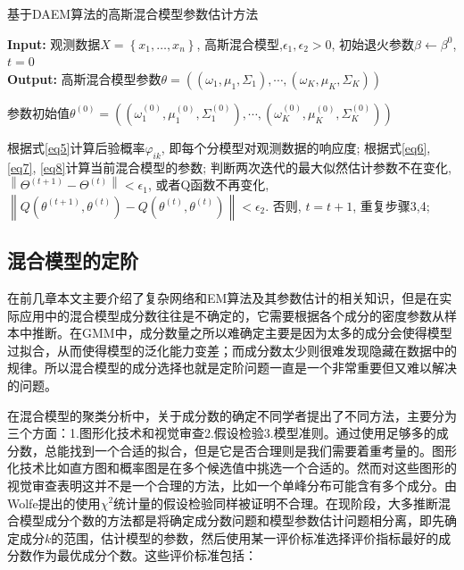 \documentclass[a4paper,12pt,openany,oneside,utf-8]{ctexbook}
\begin{document}
    \begin{algorithm}
	\caption{基于DAEM算法的高斯混合模型参数估计方法} %
	\hspace*{0.02in} {\bf Input:} %
	观测数据$X=\left\{x_{1}, \ldots, x_{n}\right\}$, 高斯混合模型,$\epsilon_{1},\epsilon_{2}>0$, 初始退火参数$\beta\leftarrow\beta^{0}$, $t=0$\\
	\hspace*{0.02in} {\bf Output:} %
	高斯混合模型参数$\theta=\left(\left(\omega_{1}, \mu_{1}, \Sigma_{1}\right), \cdots,\left(\omega_{K}, \mu_{K}, \Sigma_{K}\right)\right)$
	\begin{algorithmic}[1]
	\State 参数初始值$\theta^{(0)}=\left(\left(\omega_{1}^{(0)}, \mu_{1}^{(0)}, \Sigma_{1}^{(0)}\right), \cdots,\left(\omega_{K}^{(0)}, \mu_{K}^{(0)}, \Sigma_{K}^{(0)}\right)\right)$ %
			
	\State 根据式\ref{eq5}计算后验概率$\varphi_{i k}$, 即每个分模型对观测数据的响应度;
	\State 根据式\ref{eq6}, \ref{eq7}, \ref{eq8}计算当前混合模型的参数;
	\State 判断两次迭代的最大似然估计参数不在变化, $\left\|\Theta^{(t+1)}-\Theta^{(t)}\right\|<\epsilon_{1}$, 或者Q函数不再变化, $\left\|Q\left(\theta^{(t+1)},\theta^{(t)}\right)-Q\left(\theta^{(t)},\theta^{(t)}\right)\right\|<\epsilon_{2}$. 否则, $t=t+1$, 重复步骤3,4;
	\EndWhile
	\end{algorithmic}
	\end{algorithm}
	
	
	
    \subsection{混合模型的定阶}
    在前几章本文主要介绍了复杂网络和EM算法及其参数估计的相关知识，但是在实际应用中的混合模型成分数往往是不确定的，它需要根据各个成分的密度参数从样本中推断。在GMM中，成分数量之所以难确定主要是因为太多的成分会使得模型过拟合，从而使得模型的泛化能力变差；而成分数太少则很难发现隐藏在数据中的规律。所以混合模型的成分选择也就是定阶问题一直是一个非常重要但又难以解决的问题。
    
    在混合模型的聚类分析中，关于成分数的确定不同学者提出了不同方法\cite{ref27}，主要分为三个方面：1.图形化技术和视觉审查2.假设检验3.模型准则。通过使用足够多的成分数，总能找到一个合适的拟合，但是它是否合理则是我们需要着重考量的。图形化技术比如直方图和概率图是在多个候选值中挑选一个合适的。然而对这些图形的视觉审查表明这并不是一个合理的方法，比如一个单峰分布可能含有多个成分。由Wolfe\cite{ref28}提出的使用$\chi ^2$统计量的假设检验同样被证明不合理。在现阶段，大多推断混合模型成分个数的方法都是将确定成分数问题和模型参数估计问题相分离，即先确定成分$k$的范围，估计模型的参数，然后使用某一评价标准选择评价指标最好的成分数作为最优成分个数。这些评价标准包括：
\end{document}
